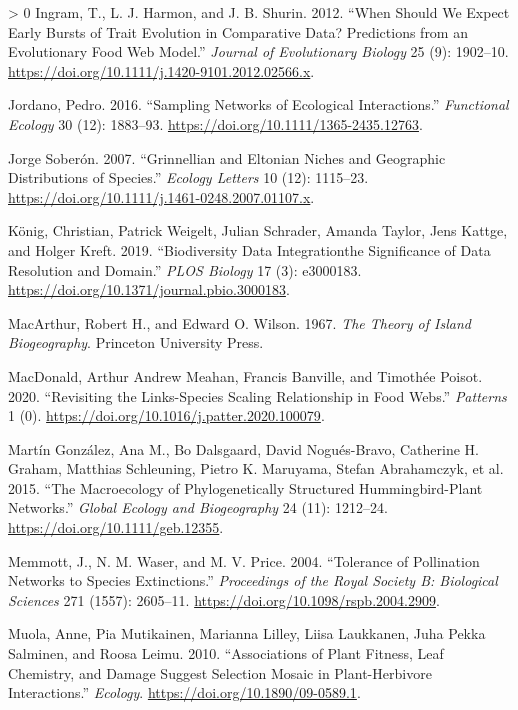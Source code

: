 \documentclass[12pt]{article}
\newlength{\cslhangindent}
\newenvironment{CSLReferences}[3] %
 {%
  \setlength{\parindent}{0pt}
  \ifodd #1 \everypar{\setlength{\hangindent}{\cslhangindent}}\ignorespaces\fi
  \ifnum #2 > 0
  \setlength{\parskip}{#2\baselineskip}
  \fi
 }%
 {}
\begin{document}
\begin{CSLReferences}{1}{0}
\leavevmode\hypertarget{ref-Ingram2012WheSho}{}%
Ingram, T., L. J. Harmon, and J. B. Shurin. 2012. {``When Should We
Expect Early Bursts of Trait Evolution in Comparative Data? Predictions
from an Evolutionary Food Web Model.''} \emph{Journal of Evolutionary
Biology} 25 (9): 1902--10.
\url{https://doi.org/10.1111/j.1420-9101.2012.02566.x}.

\leavevmode\hypertarget{ref-Jordano2016SamNet}{}%
Jordano, Pedro. 2016. {``Sampling Networks of Ecological
Interactions.''} \emph{Functional Ecology} 30 (12): 1883--93.
\url{https://doi.org/10.1111/1365-2435.12763}.

\leavevmode\hypertarget{ref-JorgeSoberon2007GriElt}{}%
Jorge Soberón. 2007. {``Grinnellian and Eltonian Niches and Geographic
Distributions of Species.''} \emph{Ecology Letters} 10 (12): 1115--23.
\url{https://doi.org/10.1111/j.1461-0248.2007.01107.x}.

\leavevmode\hypertarget{ref-Konig2019BioDat}{}%
König, Christian, Patrick Weigelt, Julian Schrader, Amanda Taylor, Jens
Kattge, and Holger Kreft. 2019. {``Biodiversity Data Integrationthe
Significance of Data Resolution and Domain.''} \emph{PLOS Biology} 17
(3): e3000183. \url{https://doi.org/10.1371/journal.pbio.3000183}.

\leavevmode\hypertarget{ref-MacArthur1967TheIsl}{}%
MacArthur, Robert H., and Edward O. Wilson. 1967. \emph{The Theory of
Island Biogeography}. Princeton University Press.

\leavevmode\hypertarget{ref-MacDonald2020RevLin}{}%
MacDonald, Arthur Andrew Meahan, Francis Banville, and Timothée Poisot.
2020. {``Revisiting the Links-Species Scaling Relationship in Food
Webs.''} \emph{Patterns} 1 (0).
\url{https://doi.org/10.1016/j.patter.2020.100079}.

\leavevmode\hypertarget{ref-MartinGonzalez2015MacPhy}{}%
Martín González, Ana M., Bo Dalsgaard, David Nogués-Bravo, Catherine H.
Graham, Matthias Schleuning, Pietro K. Maruyama, Stefan Abrahamczyk, et
al. 2015. {``The Macroecology of Phylogenetically Structured
Hummingbird-Plant Networks.''} \emph{Global Ecology and Biogeography} 24
(11): 1212--24. \url{https://doi.org/10.1111/geb.12355}.

\leavevmode\hypertarget{ref-Memmott2004TolPol}{}%
Memmott, J., N. M. Waser, and M. V. Price. 2004. {``Tolerance of
Pollination Networks to Species Extinctions.''} \emph{Proceedings of the
Royal Society B: Biological Sciences} 271 (1557): 2605--11.
\url{https://doi.org/10.1098/rspb.2004.2909}.

\leavevmode\hypertarget{ref-Muola2010AssPla}{}%
Muola, Anne, Pia Mutikainen, Marianna Lilley, Liisa Laukkanen, Juha
Pekka Salminen, and Roosa Leimu. 2010. {``Associations of Plant Fitness,
Leaf Chemistry, and Damage Suggest Selection Mosaic in Plant-Herbivore
Interactions.''} \emph{Ecology}.
\url{https://doi.org/10.1890/09-0589.1}.


\end{CSLReferences}
\end{document}
